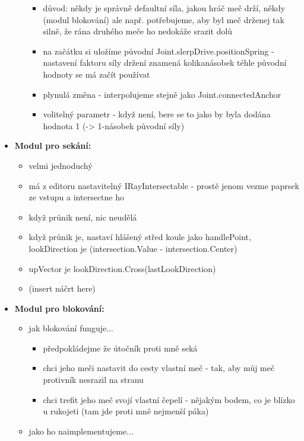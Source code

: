 \begin{itemize}
\begin{itemize}
        \begin{itemize}
          \item důvod: někdy je správně defaultní síla, jakou hráč meč drží, někdy (modul blokování) ale např. potřebujeme, aby byl meč drženej tak silně, že rána druhého meče ho nedokáže srazit dolů
          \item na začátku si uložíme původní Joint.slerpDrive.positionSpring - nastavení faktoru síly držení znamená kolikanásobek téhle původní hodnoty se má začít používat
          \item plynulá změna - interpolujeme stejně jako Joint.connectedAnchor
          \item volitelný parametr - když není, bere se to jako by byla dodána hodnota 1 (-> 1-násobek původní síly)
        \end{itemize}
    \end{itemize}
  \item \textbf{Modul pro sekání:} 
    \begin{itemize}
      \item velmi jednoduchý
      \item má z editoru nastavitelný IRayIntersectable - prostě jenom vezme paprsek ze vstupu a intersectne ho
      \item když průnik není, nic neudělá
      \item když průnik je, nastaví hlášený střed koule jako handlePoint, lookDirection je (intersection.Value - intersection.Center)
      \item upVector je lookDirection.Cross(lastLookDirection) 
      \item (insert náčrt here)
    \end{itemize}
  \item \textbf{Modul pro blokování:} 
    \begin{itemize}
      \item jak blokování funguje...
        \begin{itemize}
          \item předpokládejme že útočník proti mně seká
          \item chci jeho meči nastavit do cesty vlastní meč - tak, aby můj meč protivník nesrazil na stranu
          \item chci trefit jeho meč svojí vlastní čepelí - nějakým bodem, co je blízko u rukojeti (tam jde proti mně nejmenší páka) 
        \end{itemize}
      \item jako ho naimplementujeme...

\end{itemize}
\end{itemize}

